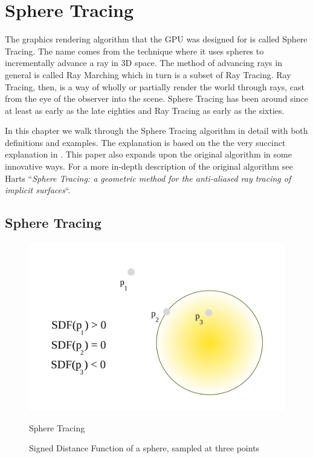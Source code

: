 \chapter{Sphere Tracing} \label{spheretracing}

	The graphics rendering algorithm that the GPU was designed for is called
	Sphere Tracing\cite{Hart1996}. The name comes from the technique where it
	uses spheres to incrementally advance a ray in 3D space. The method of
	advancing rays in general is called Ray Marching which in turn is a subset of
	Ray Tracing\cite{Whitted1980a}. Ray Tracing, then, is a way of wholly or
	partially render the world through rays, cast from the eye of the observer
	into the scene. Sphere Tracing has been around since at least as early as the
	late eighties\cite{Hart1989} and Ray Tracing as early as the
	sixties\cite{Appel1968}.

	In this chapter we walk through the Sphere Tracing algorithm in detail with
	both definitions and examples. The explanation is based on the the very
	succinct explanation in \cite{Korndorfer2014}. This paper also expands upon
	the original algorithm in some innovative ways. For a more in-depth
	description of the original algorithm see Harts ``\emph{Sphere Tracing: a
	geometric method for the anti-aliased ray tracing of implicit
	surfaces}``\cite{Hart1996}.

	\section{Sphere Tracing} 

		\begin{figure}
			\begin{flushright}
				\includegraphics[width=0.9\linewidth]{figure/SDF} 
			\end{flushright}
			\caption{ Signed Distance Function of a sphere, sampled at three points}
			\vspace{40pt}Sphere Tracing
		\end{figure}

